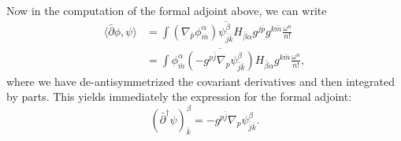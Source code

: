 \documentclass{../mathnotes}
\begin{document}
Now in the computation of the formal adjoint above, we can write
\begin{align*}
    \langle\bar\partial\phi,\psi\rangle&=\int (\nabla_{\bar p}\phi^\alpha_{\bar m})\overline{\psi^\beta_{\bar j\bar k}}H_{\bar\beta\alpha}g^{j\bar p}g^{k\bar m}\frac{\omega^n}{n!}\\
    &=\int\phi^\alpha_{\bar m}\overline{(-g^{p\bar j}\nabla_p\psi^{\beta}_{\bar j\bar k})}H_{\bar\beta\alpha}g^{k\bar m}\frac{\omega^n}{n!},
\end{align*}
where we have de-antisymmetrized the covariant derivatives and then integrated by parts. This yields immediately the expression for the formal adjoint:
\[(\bar\partial^\dagger\psi)_{\bar k}^\beta=-g^{p\bar j}\nabla_p\psi^{\beta}_{\bar j\bar k}.\]
\end{document}
